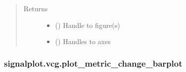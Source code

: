 \documentclass[letterpaper,10pt,english]{sphinxmanual}
\begin{document}
\begin{fulllineitems}
\begin{quote}
\begin{description}
\item[{Returns}] \leavevmode
\sphinxAtStartPar
\begin{itemize}
\item {} 
\sphinxAtStartPar
{} () \textendash{} Handle to figure(s)

\item {} 
\sphinxAtStartPar
{} () \textendash{} Handles to axes

\end{itemize}


\end{description}\end{quote}

\end{fulllineitems}



\subsubsection{signalplot.vcg.plot\_metric\_change\_barplot}
\label{\detokenize{_autosummary/signalplot.vcg.plot_metric_change_barplot:signalplot-vcg-plot-metric-change-barplot}}\label{\detokenize{_autosummary/signalplot.vcg.plot_metric_change_barplot::doc}}
\end{document}
